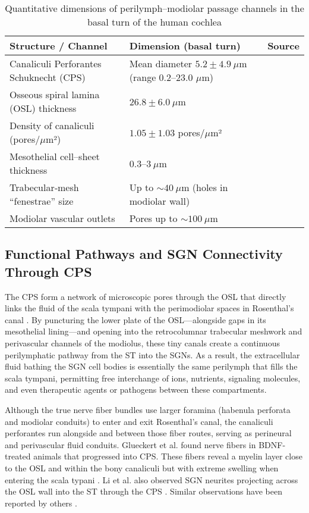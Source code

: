 \begin{table}[ht]
\centering
\caption{Quantitative dimensions of perilymph–modiolar passage channels in the basal turn of the human cochlea}
\label{tab:channels_dimensions}
\begin{tabular}{lll}
\toprule
\textbf{Structure / Channel} & \textbf{Dimension (basal turn)} & \textbf{Source} \\
\midrule
Canaliculi Perforantes Schuknecht (CPS) & Mean diameter $5.2 \pm 4.9\ \mu$m (range 0.2--23.0 $\mu$m)       & \cite{ShepherdColreavy2004} \\
Osseous spiral lamina (OSL) thickness & $26.8 \pm 6.0\ \mu$m                                      & \cite{ShepherdColreavy2004} \\
Density of canaliculi (pores/$\mu$m²)   & $1.05 \pm 1.03$ pores/$\mu$m²                                  & \cite{ShepherdColreavy2004} \\
Mesothelial cell–sheet thickness    & $0.3$--$3\ \mu$m                                            & \cite{raskandersen2006} \\
Trabecular‐mesh “fenestrae” size    & Up to $\sim 40\ \mu$m (holes in modiolar wall)             & \cite{raskandersen2006} \\
Modiolar vascular outlets           & Pores up to $\sim 100\ \mu$m                               & \cite{raskandersen2006} \\
\bottomrule
\end{tabular}
\end{table}

\subsection{Functional Pathways and SGN Connectivity Through CPS}
The CPS form a network of microscopic pores through the OSL that directly links the fluid of the scala tympani with the perimodiolar spaces in Rosenthal’s canal \cite{raskandersen2006}. By puncturing the lower plate of the OSL---alongside gaps in its mesothelial lining---and opening into the retrocolumnar trabecular meshwork and perivascular channels of the modiolus, these tiny canals create a continuous perilymphatic pathway from the ST into the SGNs. As a result, the extracellular fluid bathing the SGN cell bodies is essentially the same perilymph that fills the scala tympani, permitting free interchange of ions, nutrients, signaling molecules, and even therapeutic agents or pathogens between these compartments.

Although the true nerve fiber bundles use larger foramina (habenula perforata and modiolar conduits) to enter and exit Rosenthal’s canal, the canaliculi perforantes run alongside and between those fiber routes, serving as perineural and perivascular fluid conduits. Glueckert et al. found nerve fibers in BDNF-treated animals that progressed into CPS. These fibers reveal a myelin layer close to the OSL and within the bony canaliculi but with extreme swelling when entering the scala typani \cite{glueckert2008}. Li et al. also observed SGN neurites projecting across the OSL wall into the ST through the CPS \cite{Li2017}. Similar observations have been reported by others \cite{Staecker1996, Leake2008, Leake2011, Wise2011}.  

